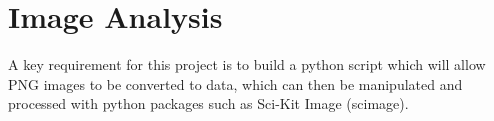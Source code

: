 \documentclass[report.tex]{subfiles}
\begin{document}
\section{Image Analysis}
\noindent A key requirement for this project is to build a python script which will allow PNG images to be converted to data, which can then be manipulated and processed with python packages such as Sci-Kit Image (scimage).
\end{document}

